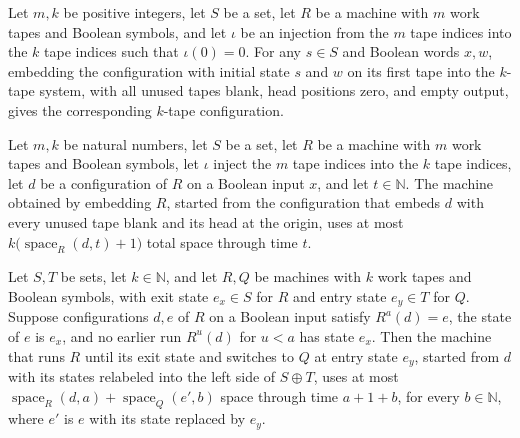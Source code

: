 \begin{lemma}
\label{Complexity.b3a_embed_cfg}
\leanok
{}
Let $m,k$ be positive integers, let $S$ be a set, let $R$ be a machine with $m$ work
tapes and Boolean symbols, and let $\iota$ be an injection from the $m$ tape indices
into the $k$ tape indices such that $\iota(0)=0$. For any $s\in S$ and Boolean words
$x,w$, embedding the configuration with initial state $s$ and $w$ on its first tape into
the $k$-tape system, with all unused tapes blank, head positions zero, and empty output,
gives the corresponding $k$-tape configuration.
\end{lemma}

\begin{lemma}
\label{Complexity.b3a_embed_space}
\leanok
{}
Let $m,k$ be natural numbers, let $S$ be a set, let $R$ be a machine with $m$ work tapes
and Boolean symbols, let $\iota$ inject the $m$ tape indices into the $k$ tape indices,
let $d$ be a configuration of $R$ on a Boolean input $x$, and let $t\in\mathbb N$. The
machine obtained by embedding $R$, started from the configuration that embeds $d$ with
every unused tape blank and its head at the origin, uses at most
$k\bigl(\operatorname{space}_R(d,t)+1\bigr)$ total space through time $t$.
\end{lemma}

\begin{lemma}
\label{Complexity.b3a_seam_space}
\leanok
{}
Let $S,T$ be sets, let $k\in\mathbb N$, and let $R,Q$ be machines with $k$ work tapes
and Boolean symbols, with exit state $e_x\in S$ for $R$ and entry state $e_y\in T$ for
$Q$. Suppose configurations $d,e$ of $R$ on a Boolean input satisfy $R^a(d)=e$, the
state of $e$ is $e_x$, and no earlier run $R^u(d)$ for $u<a$ has state $e_x$. Then the
machine that runs $R$ until its exit state and switches to $Q$ at entry state $e_y$,
started from $d$ with its states relabeled into the left side of $S\oplus T$, uses at
most $\operatorname{space}_R(d,a)+\operatorname{space}_Q(e',b)$ space through time
$a+1+b$, for every $b\in\mathbb N$, where $e'$ is $e$ with its state replaced by $e_y$.
\end{lemma}

